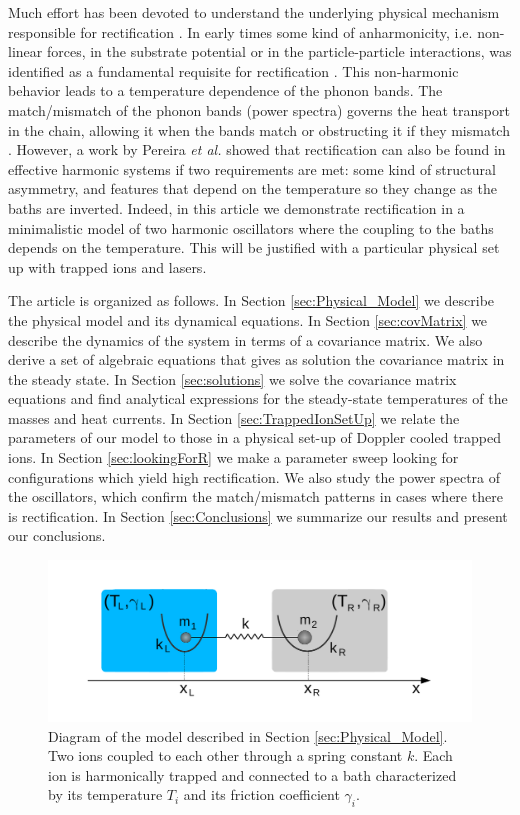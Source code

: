 Much effort has been devoted to  understand the underlying physical mechanism responsible for  rectification \cite{Pereira2019}.
%
In early times some kind of anharmonicity,  i.e. non-linear forces, in the substrate potential or in the particle-particle interactions, was identified as a fundamental requisite for rectification \cite{Li2012,Li2008,Hu2006,Zeng2008,Katz2016,Benenti2016}. This non-harmonic behavior leads to a temperature dependence of the phonon bands. The match/mismatch of the phonon bands (power spectra) governs the heat transport in the chain, allowing it when the bands match or obstructing it if they mismatch \cite{Terraneo2002,Li2004}. However, a work by Pereira \textit{et al.} \cite{Pereira2017} showed that rectification can also be found in effective harmonic systems if two requirements are met: some kind of structural asymmetry, and features that depend on the temperature so they change as the baths are inverted. Indeed,  in this article we demonstrate rectification in a minimalistic model of two harmonic oscillators where the coupling to the baths depends on the temperature.
%
This will be justified with a particular physical set up with trapped ions and lasers.

%

The article is organized as follows. In Section \ref{sec:Physical_Model}
we describe the physical model and its dynamical equations. In Section \ref{sec:covMatrix} we describe the dynamics of the system in terms of a covariance matrix. We also derive a set of algebraic equations that gives as solution the covariance matrix in the steady state. In Section \ref{sec:solutions} we solve the covariance matrix equations and find analytical expressions for the steady-state temperatures of the masses and heat currents. In Section \ref{sec:TrappedIonSetUp} we relate the parameters of our model to those in a physical set-up of Doppler cooled trapped ions. In Section \ref{sec:lookingForR} we make a parameter sweep looking for configurations which yield high rectification. We also study the power spectra of the oscillators, which confirm the match/mismatch patterns in cases where there is rectification. In Section \ref{sec:Conclusions} we summarize our results and present our conclusions.

\begin{figure}
  \centering
  \includegraphics[width=1.1\linewidth]{Figures/model_diagram.pdf}
  \caption{Diagram of the model described in Section \ref{sec:Physical_Model}. Two ions coupled to each other through a spring constant $k$. Each ion is harmonically trapped and connected to a bath characterized by its temperature $T_i$ and its friction coefficient $\gamma_i$. }
  \label{fig:model_diagram}
\end{figure}

